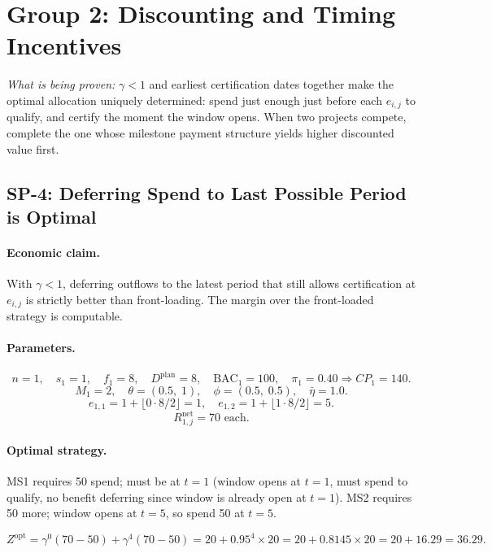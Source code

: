 \documentclass[11pt, a4paper]{article}
\newcommand{\BAC}{\mathrm{BAC}}
\begin{document}
\section{Group 2: Discounting and Timing Incentives}

\textit{What is being proven:} $\gamma<1$ and earliest certification dates
together make the optimal allocation uniquely determined: spend just enough
just before each $e_{i,j}$ to qualify, and certify the moment the window
opens. When two projects compete, complete the one whose milestone
payment structure yields higher discounted value first.

\subsection{SP-4: Deferring Spend to Last Possible Period is Optimal}

\paragraph{Economic claim.}
With $\gamma<1$, deferring outflows to the latest period that still allows
certification at $e_{i,j}$ is strictly better than front-loading. The
margin over the front-loaded strategy is computable.

\paragraph{Parameters.}
\[
  n=1,\quad s_1=1,\quad f_1=8,\quad D^{\mathrm{plan}}=8,\quad
  \BAC_1=100,\quad\pi_1=0.40\Rightarrow CP_1=140.
\]
\[
  M_1=2,\quad\theta=(0.5,\;1),\quad\phi=(0.5,\;0.5),\quad\bar\eta=1.0.
\]
\[
  e_{1,1}=1+\lfloor0\cdot8/2\rfloor=1,\quad
  e_{1,2}=1+\lfloor1\cdot8/2\rfloor=5.
\]
\[
  R_{1,j}^{\mathrm{net}}=70\text{ each.}
\]

\paragraph{Optimal strategy.}
MS1 requires 50 spend; must be at $t=1$ (window opens at $t=1$, must
spend to qualify, no benefit deferring since window is already open
at $t=1$). MS2 requires 50 more; window opens at $t=5$, so spend 50
at $t=5$.

\[
  Z^{\mathrm{opt}} = \gamma^0(70-50) + \gamma^4(70-50)
    = 20 + 0.95^4\times20 = 20 + 0.8145\times20
    = 20 + 16.29 = \mathbf{36.29}.
\]
\end{document}
